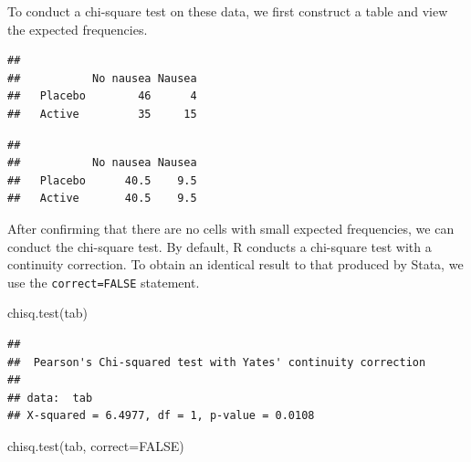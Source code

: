\documentclass[
]{memoir}
\newenvironment{Shaded}{\begin{snugshade}}{\end{snugshade}}
\newcommand{\AttributeTok}[1]{\textcolor[rgb]{0.77,0.63,0.00}{#1}}
\newcommand{\ConstantTok}[1]{\textcolor[rgb]{0.00,0.00,0.00}{#1}}
\newcommand{\FunctionTok}[1]{\textcolor[rgb]{0.00,0.00,0.00}{#1}}
\newcommand{\NormalTok}[1]{#1}
\newcommand{\OtherTok}[1]{\textcolor[rgb]{0.56,0.35,0.01}{#1}}
\newcommand{\SpecialCharTok}[1]{\textcolor[rgb]{0.00,0.00,0.00}{#1}}
\begin{document}
To conduct a chi-square test on these data, we first construct a table and view the expected frequencies.

\begin{Shaded}
\end{Shaded}

\begin{verbatim}
##          
##           No nausea Nausea
##   Placebo        46      4
##   Active         35     15
\end{verbatim}

\begin{Shaded}
\end{Shaded}

\begin{verbatim}
##          
##           No nausea Nausea
##   Placebo      40.5    9.5
##   Active       40.5    9.5
\end{verbatim}

After confirming that there are no cells with small expected frequencies, we can conduct the chi-square test. By default, R conducts a chi-square test with a continuity correction. To obtain an identical result to that produced by Stata, we use the \texttt{correct=FALSE} statement.

\begin{Shaded}
\begin{Highlighting}[]
\FunctionTok{chisq.test}\NormalTok{(tab)}
\end{Highlighting}
\end{Shaded}

\begin{verbatim}
## 
##  Pearson's Chi-squared test with Yates' continuity correction
## 
## data:  tab
## X-squared = 6.4977, df = 1, p-value = 0.0108
\end{verbatim}

\begin{Shaded}
\begin{Highlighting}[]
\FunctionTok{chisq.test}\NormalTok{(tab, }\AttributeTok{correct=}\ConstantTok{FALSE}\NormalTok{)}
\end{Highlighting}
\end{Shaded}
\end{document}
